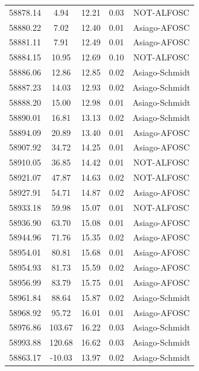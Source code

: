 \begin{longtable}{|c|c|c|c|c|}
 58878.14 &    4.94 &       12.21 &          0.03 & NOT-ALFOSC   \\
 58880.22 &    7.02 &       12.40 &          0.01 & Asiago-AFOSC  \\
 58881.11 &    7.91 &       12.49 &          0.01 & Asiago-AFOSC  \\
 58884.15 &   10.95 &       12.69 &          0.10 & NOT-ALFOSC   \\
 58886.06 &   12.86 &       12.85 &          0.02 & Asiago-Schmidt \\
 58887.23 &   14.03 &       12.93 &          0.02 & Asiago-Schmidt \\
 58888.20 &   15.00 &       12.98 &          0.01 & Asiago-Schmidt \\
 58890.01 &   16.81 &       13.13 &          0.02 & Asiago-Schmidt \\
 58894.09 &   20.89 &       13.40 &          0.01 & Asiago-AFOSC  \\
 58907.92 &   34.72 &       14.25 &          0.01 & Asiago-AFOSC  \\
 58910.05 &   36.85 &       14.42 &          0.01 & NOT-ALFOSC   \\
 58921.07 &   47.87 &       14.63 &          0.02 & NOT-ALFOSC   \\
 58927.91 &   54.71 &       14.87 &          0.02 & Asiago-AFOSC  \\
 58933.18 &   59.98 &       15.07 &          0.01 & NOT-ALFOSC   \\
 58936.90 &   63.70 &       15.08 &          0.01 & Asiago-AFOSC  \\
 58944.96 &   71.76 &       15.35 &          0.02 & Asiago-AFOSC  \\
 58954.01 &   80.81 &       15.68 &          0.01 & Asiago-AFOSC  \\
 58954.93 &   81.73 &       15.59 &          0.02 & Asiago-AFOSC  \\
 58956.99 &   83.79 &       15.75 &          0.01 & Asiago-AFOSC  \\
 58961.84 &   88.64 &       15.87 &          0.02 & Asiago-Schmidt \\
 58968.92 &   95.72 &       16.01 &          0.01 & Asiago-AFOSC  \\
 58976.86 &  103.67 &       16.22 &          0.03 & Asiago-Schmidt \\
 58993.88 &  120.68 &       16.62 &          0.03 & Asiago-Schmidt \\
 58863.17 &  -10.03 &       13.97 &          0.02 & Asiago-Schmidt \\

\end{longtable}
